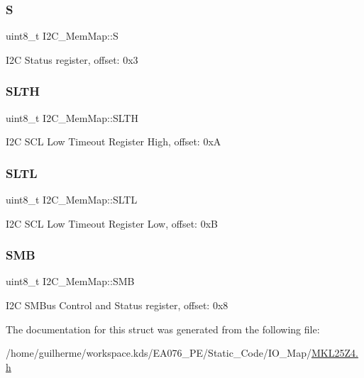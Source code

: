 \subsubsection{\texorpdfstring{S}{S}}
{\footnotesize\ttfamily uint8\+\_\+t I2\+C\+\_\+\+Mem\+Map\+::S}

I2C Status register, offset\+: 0x3 \mbox{\label{struct_i2_c___mem_map_aac56d4be80ad622d7bf85bdd8c29504c}} 
\subsubsection{\texorpdfstring{S\+L\+TH}{SLTH}}
{\footnotesize\ttfamily uint8\+\_\+t I2\+C\+\_\+\+Mem\+Map\+::\+S\+L\+TH}

I2C S\+CL Low Timeout Register High, offset\+: 0xA \mbox{\label{struct_i2_c___mem_map_afd5aa3cef3245893addeb55556e1ceff}} 
\subsubsection{\texorpdfstring{S\+L\+TL}{SLTL}}
{\footnotesize\ttfamily uint8\+\_\+t I2\+C\+\_\+\+Mem\+Map\+::\+S\+L\+TL}

I2C S\+CL Low Timeout Register Low, offset\+: 0xB \mbox{\label{struct_i2_c___mem_map_a14ca29af4960a6588080acb71f62d5fa}} 
\subsubsection{\texorpdfstring{S\+MB}{SMB}}
{\footnotesize\ttfamily uint8\+\_\+t I2\+C\+\_\+\+Mem\+Map\+::\+S\+MB}

I2C S\+M\+Bus Control and Status register, offset\+: 0x8 

The documentation for this struct was generated from the following file\+:\begin{DoxyCompactItemize}
\item 
/home/guilherme/workspace.\+kds/\+E\+A076\+\_\+\+P\+E/\+Static\+\_\+\+Code/\+I\+O\+\_\+\+Map/\hyperlink{_m_k_l25_z4_8h}{M\+K\+L25\+Z4.\+h}\end{DoxyCompactItemize}
